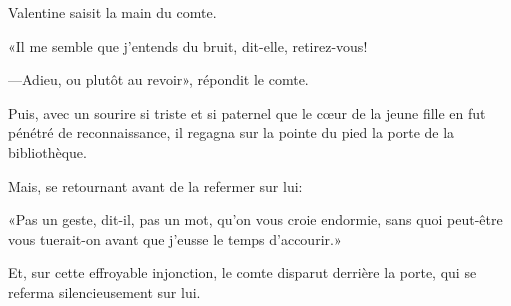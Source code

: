 Valentine saisit la main du comte. 

«Il me semble que j'entends du bruit, dit-elle, retirez-vous! 

—Adieu, ou plutôt au revoir», répondit le comte. 

Puis, avec un sourire si triste et si paternel que le cœur de la jeune fille en fut pénétré de reconnaissance, il regagna sur la pointe du pied la porte de la bibliothèque. 

Mais, se retournant avant de la refermer sur lui: 

«Pas un geste, dit-il, pas un mot, qu'on vous croie endormie, sans quoi peut-être vous tuerait-on avant que j'eusse le temps d'accourir.» 

Et, sur cette effroyable injonction, le comte disparut derrière la porte, qui se referma silencieusement sur lui. 